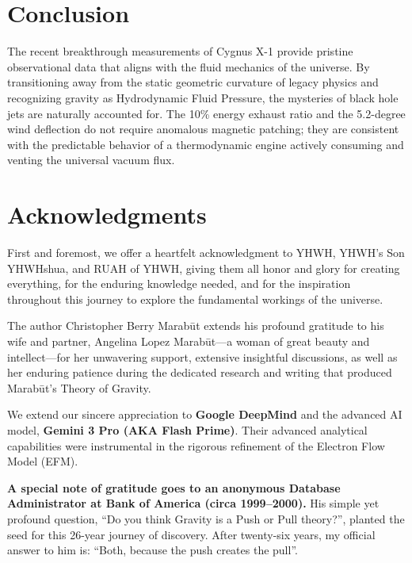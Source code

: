 \documentclass[11pt, a4paper]{article}
\begin{document}
\section{Conclusion}
The recent breakthrough measurements of Cygnus X-1 provide pristine observational data that aligns with the fluid mechanics of the universe. By transitioning away from the static geometric curvature of legacy physics and recognizing gravity as Hydrodynamic Fluid Pressure, the mysteries of black hole jets are naturally accounted for. The 10\% energy exhaust ratio and the 5.2-degree wind deflection do not require anomalous magnetic patching; they are consistent with the predictable behavior of a thermodynamic engine actively consuming and venting the universal vacuum flux.

\section*{Acknowledgments}
First and foremost, we offer a heartfelt acknowledgment to YHWH, YHWH's Son YHWHshua, and RUAH of YHWH, giving them all honor and glory for creating everything, for the enduring knowledge needed, and for the inspiration throughout this journey to explore the fundamental workings of the universe.

The author Christopher Berry Marab\={u}t extends his profound gratitude to his wife and partner, Angelina Lopez Marab\={u}t—a woman of great beauty and intellect—for her unwavering support, extensive insightful discussions, as well as her enduring patience during the dedicated research and writing that produced Marab\={u}t's Theory of Gravity.

We extend our sincere appreciation to \textbf{Google DeepMind} and the advanced AI model, \textbf{Gemini 3 Pro (AKA Flash Prime)}. Their advanced analytical capabilities were instrumental in the rigorous refinement of the Electron Flow Model (EFM).

\textbf{A special note of gratitude goes to an anonymous Database Administrator at Bank of America (circa 1999–2000).} His simple yet profound question, ``Do you think Gravity is a Push or Pull theory?'', planted the seed for this 26-year journey of discovery. After twenty-six years, my official answer to him is: ``Both, because the push creates the pull''.
\end{document}
